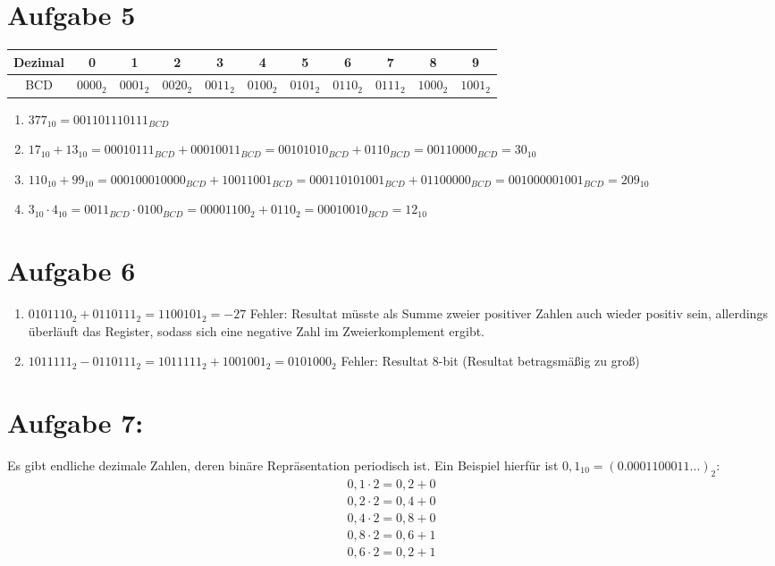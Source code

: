 \documentclass[a4paper]{article}
\begin{document}
\section*{Aufgabe 5}
\begin{tabular}{c|cccccccccc}
	Dezimal & 0 & 1 & 2 & 3 & 4 & 5 & 6 & 7 & 8 & 9 \\
	\hline
	BCD		& $0000_2$ & $0001_2$ & $0020_2$ & $0011_2$ & $0100_2$ & $0101_2$ & $0110_2$ & $0111_2$ & $1000_2$ & $1001_2$
\end{tabular}
\begin{enumerate}[label=\alph*)]
    \item $377_{10} = 001101110111_{BCD}$
    \item $17_{10} + 13_{10} = 00010111_{BCD} + 00010011_{BCD} = 0010 1010_{BCD} + 0110_{BCD} = 00110000_{BCD} = 30_{10}$
    \item $110_{10} + 99_{10} = 0001 0001 0000_{BCD} + 1001 1001_{BCD} = 0001 1010 1001_{BCD} + 0110 0000_{BCD} = 001000001001_{BCD} = 209_{10}$
    \item $3_{10} \cdot 4_{10} = 0011_{BCD} \cdot 0100_{BCD} = 00001100_2 + 0110_2 = 00010010_{BCD} = 12_{10}$
\end{enumerate}

\section*{Aufgabe 6}
\begin{enumerate}[label=\alph*)]
    \item $0101110_2 + 0110111_2 = 1100101_2 = -27$ Fehler: Resultat müsste als Summe zweier positiver Zahlen auch wieder positiv sein, allerdings überläuft das Register, sodass sich eine negative Zahl im Zweierkomplement ergibt.  
    \item $1011111_2 - 0110111_2 = 1011111_2 + 1001001_2 = 0101000_2$ Fehler: Resultat 8-bit (Resultat betragsmäßig zu groß)
\end{enumerate}

\section*{Aufgabe 7:}
Es gibt endliche dezimale Zahlen, deren binäre Repräsentation periodisch ist. Ein Beispiel hierfür ist $0,1_{10} = (0.0001100011...)_2:$
\begin{align*}
	0,1 \cdot 2 = 0,2 + 0 \\
	0,2 \cdot 2 = 0,4 + 0 \\
	0,4 \cdot 2 = 0,8 + 0 \\
	0,8 \cdot 2 = 0,6 + 1 \\
	0,6 \cdot 2 = 0,2 + 1
\end{align*}
\end{document}
